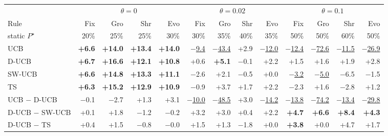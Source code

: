 \begin{tabular}{lrrrrrrrrrrrr}
\toprule
 & \multicolumn{4}{c}{$\theta=0$} & \multicolumn{4}{c}{$\theta=0.02$} & \multicolumn{4}{c}{$\theta=0.1$}\\
\cmidrule(lr){2-5}\cmidrule(lr){6-9}\cmidrule(lr){10-13}
Rule & Fix & Gro & Shr & Evo & Fix & Gro & Shr & Evo & Fix & Gro & Shr & Evo\\
\midrule
static $P^\star$ & 20\% & 25\% & 25\% & 30\% & 30\% & 35\% & 40\% & 35\% & 50\% & 50\% & 60\% & 50\%\\
\midrule
UCB & \textbf{+6.6} & \textbf{+14.0} & \textbf{+13.4} & \textbf{+14.0} & \underline{$-$9.4} & \underline{$-$43.4} & +2.9 & \underline{$-$12.0} & \underline{$-$12.4} & \underline{$-$72.6} & \underline{$-$11.5} & \underline{$-$26.9}\\
D-UCB & \textbf{+6.7} & \textbf{+16.6} & \textbf{+12.1} & \textbf{+10.8} & +0.6 & \textbf{+5.1} & $-$0.1 & +2.2 & +1.5 & +1.6 & +1.9 & +2.8\\
SW-UCB & \textbf{+6.6} & \textbf{+14.8} & \textbf{+13.3} & \textbf{+11.1} & $-$2.6 & +2.1 & $-$0.5 & +0.0 & \underline{$-$3.2} & \underline{$-$5.0} & $-$6.5 & $-$1.5\\
TS & \textbf{+6.3} & \textbf{+15.2} & \textbf{+12.9} & \textbf{+10.9} & $-$0.9 & +3.7 & +1.7 & +2.2 & $-$2.3 & +1.6 & $-$2.8 & +1.2\\
\midrule
UCB $-$ D-UCB & $-$0.1 & $-$2.7 & +1.3 & +3.1 & \underline{$-$10.0} & \underline{$-$48.5} & +3.0 & \underline{$-$14.2} & \underline{$-$13.8} & \underline{$-$74.2} & \underline{$-$13.4} & \underline{$-$29.8}\\
D-UCB $-$ SW-UCB & +0.1 & +1.8 & $-$1.2 & $-$0.2 & +3.2 & +3.0 & +0.4 & +2.2 & \textbf{+4.7} & \textbf{+6.6} & \textbf{+8.4} & \textbf{+4.3}\\
D-UCB $-$ TS & +0.4 & +1.5 & $-$0.8 & $-$0.0 & +1.5 & +1.3 & $-$1.8 & +0.0 & \textbf{+3.8} & +0.0 & +4.7 & +1.7\\
\bottomrule
\end{tabular}
